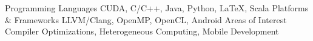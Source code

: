 \begin{cventries}
\vspace{-10mm}
    \cvskill
    {Programming Languages}
    {CUDA, C/C++, Java, Python, LaTeX, Scala}
    \cvskill
    {Platforms \& Frameworks}
    {LLVM/Clang, OpenMP, OpenCL, Android}
    \cvskill
    {Areas of Interest}
    {Compiler Optimizations, Heterogeneous Computing, Mobile Development}
\end{cventries}

